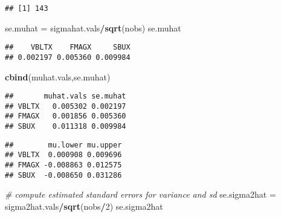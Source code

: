 \documentclass[]{article}
\newenvironment{Shaded}{\begin{snugshade}}{\end{snugshade}}
\newcommand{\KeywordTok}[1]{\textcolor[rgb]{0.13,0.29,0.53}{\textbf{#1}}}
\newcommand{\DecValTok}[1]{\textcolor[rgb]{0.00,0.00,0.81}{#1}}
\newcommand{\StringTok}[1]{\textcolor[rgb]{0.31,0.60,0.02}{#1}}
\newcommand{\CommentTok}[1]{\textcolor[rgb]{0.56,0.35,0.01}{\textit{#1}}}
\newcommand{\OperatorTok}[1]{\textcolor[rgb]{0.81,0.36,0.00}{\textbf{#1}}}
\newcommand{\NormalTok}[1]{#1}
\begin{document}
\begin{verbatim}
## [1] 143
\end{verbatim}

\begin{Shaded}
\begin{Highlighting}[]
\NormalTok{se.muhat =}\StringTok{ }\NormalTok{sigmahat.vals}\OperatorTok{/}\KeywordTok{sqrt}\NormalTok{(nobs)}
\NormalTok{se.muhat}
\end{Highlighting}
\end{Shaded}

\begin{verbatim}
##    VBLTX    FMAGX     SBUX 
## 0.002197 0.005360 0.009984
\end{verbatim}

\begin{Shaded}
\begin{Highlighting}[]
\KeywordTok{cbind}\NormalTok{(muhat.vals,se.muhat)}
\end{Highlighting}
\end{Shaded}

\begin{verbatim}
##       muhat.vals se.muhat
## VBLTX   0.005302 0.002197
## FMAGX   0.001856 0.005360
## SBUX    0.011318 0.009984
\end{verbatim}

\begin{Shaded}
\end{Shaded}

\begin{verbatim}
##        mu.lower mu.upper
## VBLTX  0.000908 0.009696
## FMAGX -0.008863 0.012575
## SBUX  -0.008650 0.031286
\end{verbatim}

\begin{Shaded}
\begin{Highlighting}[]
\CommentTok{# compute estimated standard errors for variance and sd}
\NormalTok{se.sigma2hat =}\StringTok{ }\NormalTok{sigma2hat.vals}\OperatorTok{/}\KeywordTok{sqrt}\NormalTok{(nobs}\OperatorTok{/}\DecValTok{2}\NormalTok{)}
\NormalTok{se.sigma2hat}
\end{Highlighting}
\end{Shaded}
\end{document}
